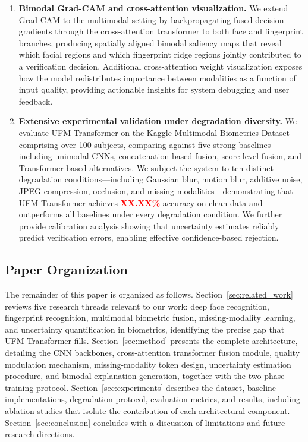 \documentclass[10pt,journal,compsoc]{IEEEtran}
\begin{document}
\begin{enumerate}
    \item[C4.] \textbf{Bimodal Grad-CAM and cross-attention visualization.} We extend Grad-CAM to the multimodal setting by backpropagating fused decision gradients through the cross-attention transformer to both face and fingerprint branches, producing spatially aligned bimodal saliency maps that reveal which facial regions and which fingerprint ridge regions jointly contributed to a verification decision. Additional cross-attention weight visualization exposes how the model redistributes importance between modalities as a function of input quality, providing actionable insights for system debugging and user feedback.

    \item[C5.] \textbf{Extensive experimental validation under degradation diversity.} We evaluate UFM-Transformer on the Kaggle Multimodal Biometrics Dataset comprising over 100 subjects, comparing against five strong baselines including unimodal CNNs, concatenation-based fusion, score-level fusion, and Transformer-based alternatives. We subject the system to ten distinct degradation conditions---including Gaussian blur, motion blur, additive noise, JPEG compression, occlusion, and missing modalities---demonstrating that UFM-Transformer achieves \textcolor{red}{\textbf{XX.XX\%}} accuracy on clean data and outperforms all baselines under every degradation condition. We further provide calibration analysis showing that uncertainty estimates reliably predict verification errors, enabling effective confidence-based rejection.
\end{enumerate}

\subsection{Paper Organization}

The remainder of this paper is organized as follows. Section~\ref{sec:related_work} reviews five research threads relevant to our work: deep face recognition, fingerprint recognition, multimodal biometric fusion, missing-modality learning, and uncertainty quantification in biometrics, identifying the precise gap that UFM-Transformer fills. Section~\ref{sec:method} presents the complete architecture, detailing the CNN backbones, cross-attention transformer fusion module, quality modulation mechanism, missing-modality token design, uncertainty estimation procedure, and bimodal explanation generation, together with the two-phase training protocol. Section~\ref{sec:experiments} describes the dataset, baseline implementations, degradation protocol, evaluation metrics, and results, including ablation studies that isolate the contribution of each architectural component. Section~\ref{sec:conclusion} concludes with a discussion of limitations and future research directions.
\end{document}
